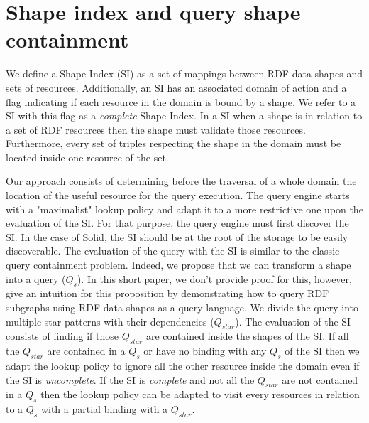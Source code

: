 \section{Shape index and query shape containment}

We define a Shape Index (SI) as a set of mappings between RDF data shapes and sets of resources.
Additionally, an SI has an associated domain of action
and a flag indicating if each resource in the domain is bound by a shape. 
We refer to a SI with this flag as a \emph{complete} Shape Index.
In a SI when a shape is in relation to a set of RDF resources then the shape must validate those resources.
Furthermore, every set of triples respecting the shape in the domain must be located inside one resource of the set.

Our approach consists of determining before the traversal of a whole domain the location of the useful resource for the query execution.
The query engine starts with a "maximalist" lookup policy and adapt it to a more restrictive one upon the evaluation of the SI.
For that purpose, the query engine must first discover the SI.
In the case of Solid, the SI should be at the root of the storage to be easily discoverable.
The evaluation of the query with the SI is similar to the classic query containment problem.
Indeed, we propose that we can transform a shape into a query ($Q_{s}$).
In this short paper, we don't provide proof for this, however, 
\citeauthor{Delva2021} give an intuition for this proposition by demonstrating how to query RDF subgraphs using RDF data shapes as a query language.
We divide the query into multiple star patterns with their dependencies ($Q_{star}$).
The evaluation of the SI consists of finding if those $Q_{star}$ are contained inside the shapes of the SI.
If all the $Q_{star}$ are contained in a $Q_{s}$ or have no binding with any $Q_{s}$ of the SI
then we adapt the lookup policy to ignore all the other resource inside the domain even if the SI is \emph{uncomplete}.
If the SI is \emph{complete} and not all the $Q_{star}$ are not contained in a $Q_{s}$ then the lookup policy can be adapted
to visit every resources in relation to a $Q_{s}$ with a partial binding with a $Q_{star}$.
